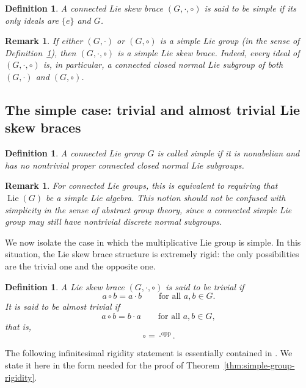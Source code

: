\documentclass[reqno]{amsart}
\newtheorem{definition}[theorem]{Definition}
\newtheorem{remark}[theorem]{Remark}
\DeclareMathOperator{\Lie}{Lie}
\begin{document}
\begin{definition}\label{def:simple-LSB}
A connected Lie skew brace $(G,\cdot,\circ)$ is said to be \emph{simple} if
its only ideals are $\{e\}$ and $G$.
\end{definition}

\begin{remark}\label{rem:simple-group-implies-simple-LSB}\rm
If either $(G,\cdot)$ or $(G,\circ)$ is a simple Lie group (in the sense of
Definition~\ref{def:simple-lie-group}), then
$(G,\cdot,\circ)$ is a simple Lie skew brace. Indeed, every ideal of
$(G,\cdot,\circ)$ is, in particular, a connected closed normal Lie subgroup of
both $(G,\cdot)$ and $(G,\circ)$.
\end{remark}


\subsection{The simple case: trivial and almost trivial Lie skew braces}\label{subsec:simple-rigidity}
\begin{definition}\label{def:simple-lie-group}
A connected Lie group $G$ is called \emph{simple} if it is nonabelian and has no
nontrivial proper connected closed normal Lie subgroups.
\end{definition}

\begin{remark}\rm
For connected Lie groups, this is equivalent to requiring that $\Lie(G)$ be a
simple Lie algebra. This notion should not be confused with simplicity in the sense of
abstract group theory, since a connected simple Lie group may still
have nontrivial discrete normal subgroups.
\end{remark}

We now isolate the case in which the multiplicative  Lie group is
simple. In this situation, the Lie skew brace structure is extremely rigid: the
only possibilities are the trivial one and the opposite one.

\begin{definition}\label{def:trivial-almost-trivial}
A Lie skew brace $(G,\cdot,\circ)$ is said to be \emph{trivial} if
\[
a\circ b=a\cdot b
\qquad\text{for all }a,b\in G.
\]
It is said to be \emph{almost trivial} if
\[
a\circ b=b\cdot a
\qquad\text{for all }a,b\in G,
\]
that is,
\[
\circ=\cdot^{\mathrm{opp}}.
\]
\end{definition}

The following infinitesimal rigidity statement is essentially contained in
\cite[Prop.~4.6]{Burde2012affineaction}. We state it here in the form needed
for the proof of Theorem~\ref{thm:simple-group-rigidity}.
\end{document}
